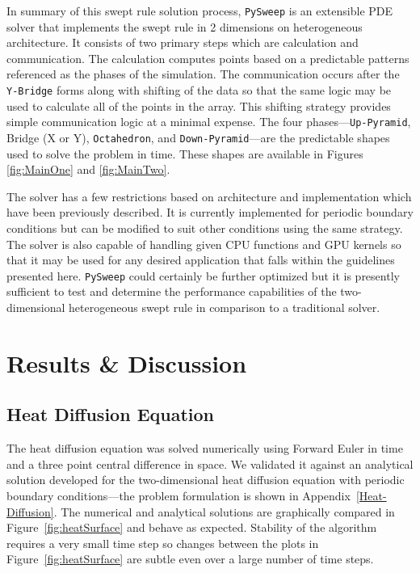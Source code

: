 \documentclass[review]{elsarticle}
\def\pysweep{\texttt{PySweep}}
\def\Up{\texttt{Up-Pyramid}}
\def\Down{\texttt{Down-Pyramid}}
\def\Oct{\texttt{Octahedron}}
\def\Yb{\texttt{Y-Bridge}}
\begin{document}
\par
In summary of this swept rule solution process, \pysweep{} is an extensible PDE solver that implements the swept rule in 2 dimensions on heterogeneous architecture. It consists of two primary steps which are calculation and communication. The calculation computes points based on a predictable patterns referenced as the phases of the simulation. The communication occurs after the \Yb{} forms along with shifting of the data so that the same logic may be used to calculate all of the points in the array. This shifting strategy provides simple communication logic at a minimal expense. The four phases---\Up{}, Bridge (X or Y), \Oct{}, and \Down{}---are the predictable shapes used to solve the problem in time. These shapes are available in Figures \ref{fig:MainOne} and \ref{fig:MainTwo}. 
\par
The solver has a few restrictions based on architecture and implementation which have been previously described. It is currently implemented for periodic boundary conditions but can be modified to suit other conditions using the same strategy. The solver is also capable of handling given CPU functions and GPU kernels so that it may be used for any desired application that falls within the guidelines presented here. \pysweep{} could certainly be further optimized but it is presently sufficient to test and determine the performance capabilities of the two-dimensional heterogeneous swept rule in comparison to a traditional solver.

\section{Results \& Discussion}
\label{results-section}


\subsection{Heat Diffusion Equation}
\label{hdeResults}
The heat diffusion equation was solved numerically using Forward Euler in time and a three point central difference in space. We validated it against an analytical solution developed for the two-dimensional heat diffusion equation with periodic boundary conditions---the problem formulation is shown in Appendix~\ref{Heat-Diffusion}. The numerical and analytical solutions are graphically compared in Figure~\ref{fig:heatSurface} and behave as expected. Stability of the algorithm requires a very small time step so changes between the plots in Figure~\ref{fig:heatSurface} are subtle even over a large number of time steps.
\end{document}
